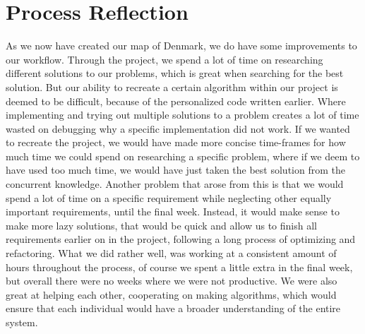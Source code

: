 \section{Process Reflection}
As we now have created our map of Denmark, we do have some improvements to our workflow. Through the project, we spend a lot of time on researching different solutions to our problems, which is great when searching for the best solution. But our ability to recreate a certain algorithm within our project is deemed to be difficult, because of the personalized code written earlier. Where implementing and trying out multiple solutions to a problem creates a lot of time wasted on debugging why a specific implementation did not work. If we wanted to recreate the project, we would have made more concise time-frames for how much time we could spend on researching a specific problem, where if we deem to have used too much time, we would have just taken the best solution from the concurrent knowledge. 
Another problem that arose from this is that we would spend a lot of time on a specific requirement while neglecting other equally important requirements, until the final week. Instead, it would make sense to make more lazy solutions, that would be quick and allow us to finish all requirements earlier on in the project, following a long process of optimizing and refactoring.
What we did rather well, was working at a consistent amount of hours throughout the process, of course we spent a little extra in the final week, but overall there were no weeks where we were not productive. We were also great at helping each other, cooperating on making algorithms, which would ensure that each individual would have a broader understanding of the entire system.